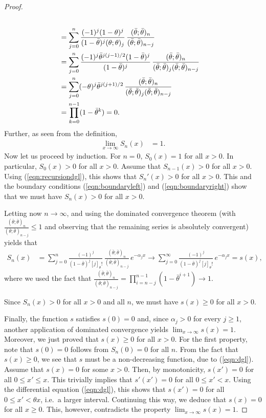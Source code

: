 \documentclass[10pt,a4paper]{amsart}
\newcommand{\1}{\mathds{1}}
\begin{document}
\begin{proof}
\begin{align}
\\
&= \sum_{j=0}^n \frac{(-1)^j(1-\theta)^j}{ (1-\bar \theta)^j (\theta;\theta)_j}\,\frac{(\bar\theta;\bar\theta)_n}{(\bar\theta;\bar\theta)_{n-j}}\notag
\\
&= \sum_{j=0}^n \frac{(-1)^j\bar\theta^{j(j-1)/2}(1-\bar\theta)^j}{(1-\bar \theta)^j} \,\frac{ (\bar\theta;\bar\theta)_n}{(\bar\theta;\bar\theta)_j(\bar\theta;\bar\theta)_{n-j}}\notag
\\
 &= \sum_{j=0}^n (-\theta)^j \bar\theta^{j(j+1)/2} \,\frac{ (\bar\theta;\bar\theta)_n}{(\bar\theta;\bar\theta)_j(\bar\theta;\bar\theta)_{n-j}}\notag
\\
&=\prod_{k=0}^{n-1}(1-\bar\theta^k)
 =0. \label{eqn:boundaryleft}
\end{align}
Further, as seen from the definition,
\begin{align} \label{eqn:boundaryright}
\lim_{x\to\infty} S_n(x) & = 1.
\end{align}
Now let us proceed by induction. For $n=0$, $S_0(x)=1$ for all $x>0$. In particular, $S_0(x)>0$ for all $x>0$. 
Assume that $S_{n-1}(x)>0$ for all $x>0$. Using (\ref{eqn:recursiondgl}), this shows that $S_n'(x)>0$ for all $x>0$. This and the boundary conditions (\ref{eqn:boundaryleft}) and (\ref{eqn:boundaryright}) show that we must have $S_n(x)>0$ for all $x>0$. 

Letting now $n\to\infty$, and using the dominated convergence theorem (with $\frac{(\bar\theta;\bar\theta)_n}{(\bar\theta;\bar\theta)_{n-j}}\le 1$ and observing that the remaining series is absolutely convergent) yields that
\begin{align*}
S_n(x) & = \sum_{j=0}^n \frac{(-1)^j}{ (1-\bar \theta)^j [j]_\theta!}\,\frac{(\bar\theta;\bar\theta)_n}{(\bar\theta;\bar\theta)_{n-j}}\, e^{-\alpha_j x} \to \sum_{j=0}^\infty \frac{(-1)^j}{ (1-\bar \theta)^j [j]_\theta!}\, e^{-\alpha_j x} = s(x),
\end{align*}
where we used the fact that $\frac{(\bar\theta;\bar\theta)_n}{(\bar\theta;\bar\theta)_{n-j}}=\prod_{i=n-j}^{n-1}(1-\bar\theta^{i+1}) \to 1$.

Since $S_n(x)>0$ for all $x>0$ and all $n$, we must have $s(x)\geq 0$ for all $x>0$.

Finally, the function $s$ satisfies $s(0)=0$ and, since $\alpha_j>0$ for every $j\ge1$, another application of
dominated convergence yields $\lim_{x\to\infty} s(x) = 1$. Moreover, we just proved that $s(x)\geq 0$ for all $x>0$. For the first property, note that $s(0)=0$ follows from $S_n(0)=0$ for all $n$.
From the fact that $s(x)\geq 0$, we see that $s$ must be a non-decreasing function, due to (\ref{eqn:dgl}). Assume that $s(x)=0$ for some $x>0$. Then, by monotonicity, $s(x')=0$ for all $0\leq x'\leq x$. This trivially implies that $s'(x')=0$ for all $0\leq x'< x$. Using the differential equation (\ref{eqn:dgl}), this shows that $s(x')=0$ for all $0\leq x' < \theta x$, i.e.\ a larger interval. Continuing this way, we deduce that $s(x)=0$ for all $x\geq 0$. This, however, contradicts the property $\lim_{x\to\infty} s(x) = 1$.
\end{proof}
\end{document}
